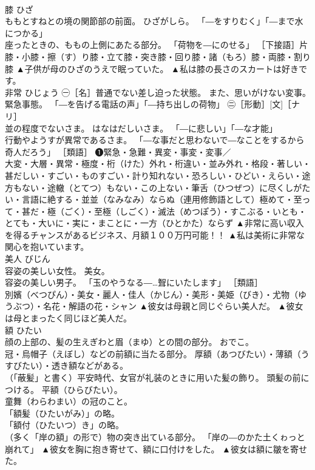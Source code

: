 \documentclass[8pt]{extreport}
\begin{document}
\begin{CJK}{UTF8}{min}
\\	膝	ひざ	
\\	ももとすねとの境の関節部の前面。 ひざがしら。 「―をすりむく」「―まで水につかる」 
\\	座ったときの、ももの上側にあたる部分。 「荷物を―にのせる」 ［下接語］片膝・小膝・擦（す）り膝・立て膝・突き膝・回り膝・諸（もろ）膝・両膝・割り膝	▲子供が母のひざのうえで眠っていた。 ▲私は膝の長さのスカートは好きです。
\\	非常	ひじょう	㊀［名］普通でない差し迫った状態。 また、思いがけない変事。 緊急事態。 「―を告げる電話の声」「―持ち出しの荷物」 ㊁［形動］[文]［ナリ］ 
\\	並の程度でないさま。 はなはだしいさま。 「―に悲しい」「―な才能」 
\\	行動やようすが異常であるさま。 「―な事だと思わないで―なことをするから奇人だろう」 ［類語］ ❶緊急・急難・異変・事変・変事／ 
\\	大変・大層・異常・極度・桁（けた）外れ・桁違い・並み外れ・格段・著しい・甚だしい・すごい・ものすごい・計り知れない・恐ろしい・ひどい・えらい・途方もない・途轍（とてつ）もない・この上ない・筆舌（ひつぜつ）に尽くしがたい・言語に絶する・並並（なみなみ）ならぬ（連用修飾語として）極めて・至って・甚だ・極（ごく）・至極（しごく）・滅法（めつぽう）・すこぶる・いとも・とても・大いに・実に・まことに・一方（ひとかた）ならず	▲非常に高い収入を得るチャンスがあるビジネス、月額１００万円可能！！ ▲私は美術に非常な関心を抱いています。
\\	美人	びじん	
\\	容姿の美しい女性。 美女。 
\\	容姿の美しい男子。 「玉のやうなる―…聟にいたします」 ［類語］
\\	別嬪（べつぴん）・美女・麗人・佳人（かじん）・美形・美姫（びき）・尤物（ゆうぶつ）・名花・解語の花・シャン	▲彼女は母親と同じぐらい美人だ。 ▲彼女は母とまったく同じほど美人だ。
\\	額	ひたい	
\\	顔の上部の、髪の生えぎわと眉（まゆ）との間の部分。 おでこ。 
\\	冠・烏帽子（えぼし）などの前額に当たる部分。 厚額（あつびたい）・薄額（うすびたい）・透き額などがある。 
\\	（「蔽髪」と書く）平安時代、女官が礼装のときに用いた髪の飾り。 頭髪の前につける。 平額（ひらびたい）。 
\\	童舞（わらわまい）の冠のこと。 
\\	「額髪（ひたいがみ）」の略。 
\\	「額付（ひたいつ）き」の略。 
\\	（多く「岸の額」の形で）物の突き出ている部分。 「岸の―のかた土くゎっと崩れて」	▲彼女を胸に抱き寄せて、額に口付けをした。 ▲彼女は額に皺を寄せた。

\end{CJK}
\end{document}
